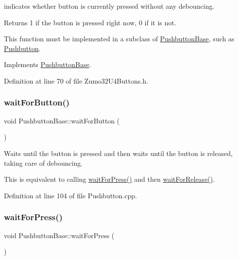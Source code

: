 indicates whether button is currently pressed without any debouncing. 

\begin{DoxyReturn}{Returns}
1 if the button is pressed right now, 0 if it is not.
\end{DoxyReturn}
This function must be implemented in a subclass of \hyperlink{class_pushbutton_base}{Pushbutton\+Base}, such as \hyperlink{class_pushbutton}{Pushbutton}. 

Implements \hyperlink{class_pushbutton_base_a5b11851f15413140b75e4574e773b6ae}{Pushbutton\+Base}.



Definition at line 70 of file Zumo32\+U4\+Buttons.\+h.

\mbox{\label{class_pushbutton_base_ab755065c930be0649597220316213e8a}} 
\subsubsection{\texorpdfstring{wait\+For\+Button()}{waitForButton()}}
{\footnotesize\ttfamily void Pushbutton\+Base\+::wait\+For\+Button (\begin{DoxyParamCaption}{ }\end{DoxyParamCaption})\hspace{0.3cm}{\ttfamily [inherited]}}



Waits until the button is pressed and then waits until the button is released, taking care of debouncing. 

This is equivalent to calling \hyperlink{class_pushbutton_base_a2e2787595c82ee0913ecf4c1eea4a2c8}{wait\+For\+Press()} and then \hyperlink{class_pushbutton_base_ae5fff34b3e1ebd62fd02b99edd6bf13a}{wait\+For\+Release()}. 

Definition at line 104 of file Pushbutton.\+cpp.

\mbox{\label{class_pushbutton_base_a2e2787595c82ee0913ecf4c1eea4a2c8}} 
\subsubsection{\texorpdfstring{wait\+For\+Press()}{waitForPress()}}
{\footnotesize\ttfamily void Pushbutton\+Base\+::wait\+For\+Press (\begin{DoxyParamCaption}{ }\end{DoxyParamCaption})\hspace{0.3cm}{\ttfamily [inherited]}}



